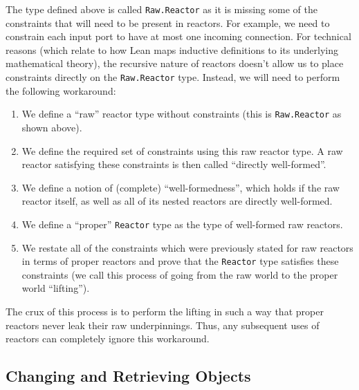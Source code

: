 The type defined above is called \lstinline{Raw.Reactor} as it is missing some of the constraints that will need to be present in reactors.
For example, we need to constrain each input port to have at most one incoming connection.
For technical reasons (which relate to how Lean maps inductive definitions to its underlying mathematical theory), the recursive nature of reactors doesn't allow us to place constraints directly on the \lstinline{Raw.Reactor} type.
Instead, we will need to perform the following workaround:

\begin{enumerate}
    \item We define a ``raw'' reactor type without constraints (this is \lstinline{Raw.Reactor} as shown above).
    \item We define the required set of constraints using this raw reactor type. A raw reactor satisfying these constraints is then called ``directly well-formed''.
    \item We define a notion of (complete) ``well-formedness'', which holds if the raw reactor itself, as well as all of its nested reactors are directly well-formed.
    \item We define a ``proper'' \lstinline{Reactor} type as the type of well-formed raw reactors.
    \item We restate all of the constraints which were previously stated for raw reactors in terms of proper reactors and prove that the \lstinline{Reactor} type satisfies these constraints (we call this process of going from the raw world to the proper world ``lifting'').
\end{enumerate}

The crux of this process is to perform the lifting in such a way that proper reactors never leak their raw underpinnings.
Thus, any subsequent uses of reactors can completely ignore this workaround.

\subsection{Changing and Retrieving Objects}